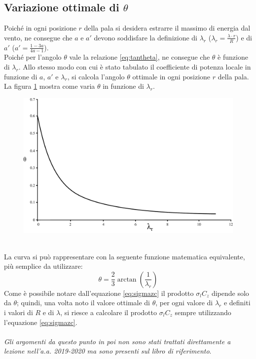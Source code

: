 \subsection{Variazione ottimale di $\theta$}
Poiché in ogni posizione $r$ della pala si desidera estrarre il massimo di energia dal vento, ne consegue che $a$ e $a'$ devono soddisfare la definizione di $\lambda_r$ ($\lambda_r = \frac{\lambda \cdot r}{R}$) e di $a'$ ($a' = \frac{1 - 3a}{4a -1}$).\\
Poiché per l'angolo $\theta$ vale la relazione \ref{eq:tantheta}, ne consegue che $\theta$ è funzione di $\lambda_r$. Allo stesso modo con cui è stato tabulato il coefficiente di potenza locale in funzione di $a$, $a'$ e $\lambda_r$, si calcola l'angolo $\theta$ ottimale in ogni posizione $r$ della pala. La figura \ref{fig:lambdatheta} mostra come varia $\theta$ in funzione di $\lambda_r$.
\begin{figure}[h!]
\centering
  \includegraphics[width=.7\textwidth]{fig/lambdatheta.pdf}
\caption{}
\label{fig:lambdatheta}
\end{figure}
\\La curva si può rappresentare con la seguente funzione matematica equivalente, più semplice da utilizzare:
\begin{equation}
\theta = \frac{2}{3} \arctan \left( \frac{1}{\lambda_r} \right)
\end{equation}
Come è possibile notare dall'equazione \ref{eq:sigmazc} il prodotto $\sigma_l C_z$ dipende solo da $\theta$; quindi, una volta noto il valore ottimale di $\theta$, per ogni valore di $\lambda_r$ e definiti i valori di $R$ e di $\lambda$, si riesce a calcolare il prodotto $\sigma_l C_z$ sempre utilizzando l'equazione \ref{eq:sigmazc}.\\
\\
\textit{Gli argomenti da questo punto in poi non sono stati trattati direttamente a lezione nell'a.a. 2019-2020 ma sono presenti sul libro di riferimento}.\\
